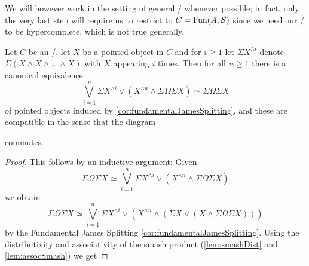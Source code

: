 We will however work in the setting of general \inftytops/ whenever possible; 
in fact, only the very last step will require us to restrict to $C=\operatorname{Fun}(A,\mathcal{S})$ since we need our \inftytop/ to be hypercomplete, which is not true generally.
\begin{corollary} 
    Let $C$ be an \inftytop/, let $X$ be a pointed object in $C$ and for $i\geq 1$ let $\Sigma X^{\wedge i}$ denote $\Sigma\left(X\wedge X\wedge\ldots\wedge X\right)$ with $X$ appearing $i$ times.
    Then for all $n\geq 1$ there is a canonical equivalence
    \begin{equation*}
        \bigvee\limits_{i=1}^n\Sigma X^{\wedge i}\vee\left(X^{\wedge n}\wedge\Sigma\Omega\Sigma X\right)\simeq\Sigma\Omega\Sigma X 
    \end{equation*}
    of pointed objects induced by \cref{cor:fundamentalJamesSplitting}, and these are compatible in the sense that the diagram
    \begin{center}
    \end{center}
    commutes.
    \begin{proof}
        This follows by an inductive argument:
        Given 
        \begin{equation*}
            \Sigma\Omega\Sigma X\simeq\bigvee\limits_{i=1}^n\Sigma X^{\wedge i}\vee\left(X^{\wedge n}\wedge\Sigma\Omega\Sigma X\right)
        \end{equation*}
        we obtain 
        \begin{equation*}
            \Sigma\Omega\Sigma X\simeq\bigvee\limits_{i=1}^n\Sigma X^{\wedge i}\vee\left(X^{\wedge n}\wedge\left(\Sigma X\vee\left(X\wedge\Sigma\Omega\Sigma X\right)\right)\right) 
        \end{equation*}
        by the Fundamental James Splitting \cref{cor:fundamentalJamesSplitting}.
        Using the distributivity and associativity of the smash product (\cref{lem:smashDist} and \cref{lem:assocSmash}) we get

\end{proof}
\end{corollary}

